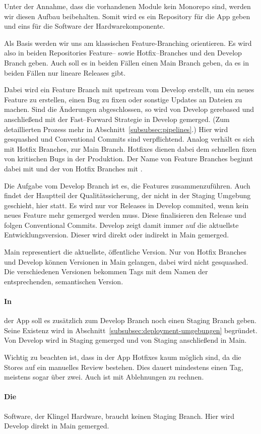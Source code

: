 Unter der Annahme, dass die vorhandenen Module kein Monorepo sind, werden wir diesen Aufbau beibehalten.
Somit wird es ein Repository für die App geben und eins für die Software der Hardwarekomponente.


Als Basis werden wir uns am klassischen Feature-Branching orientieren.
Es wird also in beiden Repositories Feature-- sowie Hotfix--Branches und den Develop Branch geben.
Auch soll es in beiden Fällen einen Main Branch geben, da es in beiden Fällen nur lineare Releases gibt.


Dabei wird ein Feature Branch mit upstream vom Develop erstellt, um ein neues Feature zu erstellen, einen Bug zu fixen oder sonstige Updates an Dateien zu machen.
Sind die Änderungen abgeschlossen, so wird von Develop gerebased und anschließend mit der Fast--Forward Strategie in Develop gemerged.
(Zum detaillierten Prozess mehr in Abschnitt~\ref{subsubsec:pipelines}.)
Hier wird gesquashed und Conventional Commits sind verpflichtend.
Analog verhält es sich mit Hotfix Branches, zur Main Branch.
Hotfixes dienen dabei dem schnellen fixen von kritischen Bugs in der Produktion.
Der Name von Feature Branches beginnt dabei mit  und der von Hotfix Branches mit .


Die Aufgabe vom Develop Branch ist es, die Features zusammenzuführen.
Auch findet der Hauptteil der Qualitätssicherung, der nicht in der Staging Umgebung geschieht, hier statt.
Es wird nur vor Releases in Develop commited, wenn kein neues Feature mehr gemerged werden muss.
Diese finalisieren den Release und folgen Conventional Commits.
Develop zeigt damit immer auf die aktuellste Entwicklungsversion.
Dieser wird direkt oder indirekt in Main gemerged.


Main representiert die aktuellste, öffentliche Version.
Nur von Hotfix Branches und Develop können Versionen in Main gelangen, dabei wird nicht gesquashed.
Die verschiedenen Versionen bekommen Tags mit dem Namen der entsprechenden, semantischen Version.


\paragraph{\large{In}} der App soll es zusätzlich zum Develop Branch noch einen Staging Branch geben.
    Seine Existenz wird in Abschnitt~\ref{subsubsec:deployment-umgebungen} begründet.
    Von Develop wird in Staging gemerged und von Staging anschließend in Main.


    Wichtig zu beachten ist, dass in der App Hotfixes kaum möglich sind, da die Stores auf ein manuelles Review bestehen.
    Dies dauert mindestens einen Tag, meistens sogar über zwei.
    Auch ist mit Ablehnungen zu rechnen.


\paragraph{\large{Die}} Software, der Klingel Hardware, braucht keinen Staging Branch.
    Hier wird Develop direkt in Main gemerged.